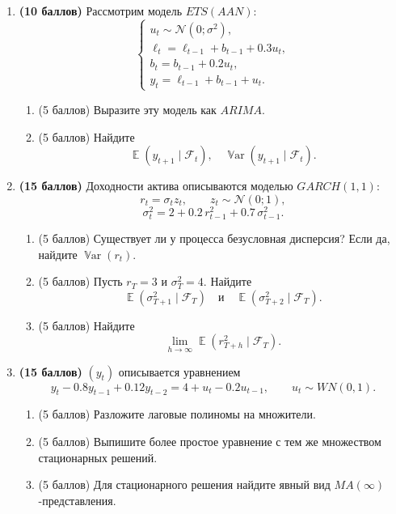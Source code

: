 \documentclass[12pt]{article}
\DeclareMathOperator{\Var}{\mathbb{V}ar}
\DeclareMathOperator{\E}{\mathbb{E}}
\newcommand \cN{\mathcal{N}}
\begin{document}
\begin{enumerate}

    \item \textbf{(10 баллов)} Рассмотрим модель $ETS(AAN)$:
    \[
    \begin{cases}
    u_t \sim \cN(0;\sigma^2),\\
    \ell_t = \ell_{t-1} + b_{t-1} + 0.3u_t,\\
    b_t = b_{t-1} + 0.2u_t,\\
    y_t = \ell_{t-1} + b_{t-1} + u_t.
    \end{cases}
    \]

    \begin{enumerate}
        \item (5 баллов) Выразите эту модель как $ARIMA$.
        \item (5 баллов) Найдите
        \[
        \E(y_{t+1}\mid \mathcal{F}_t), \quad \Var(y_{t+1}\mid \mathcal{F}_t).
        \]
    \end{enumerate}

    \item \textbf{(15 баллов)} Доходности актива описываются моделью $GARCH(1,1)$:
    \[
    r_t = \sigma_t z_t, \qquad z_t \sim \cN(0;1),
    \]
    \[
    \sigma_t^2 = 2 + 0.2\,r_{t-1}^2 + 0.7\,\sigma_{t-1}^2.
    \]

    \begin{enumerate}
        \item (5 баллов) Существует ли у процесса безусловная дисперсия? Если да, найдите $\Var(r_t)$.
        \item (5 баллов) Пусть $r_T=3$ и $\sigma_T^2=4$. Найдите
        \[
        \E(\sigma_{T+1}^2\mid \mathcal{F}_T)
        \quad \text{и} \quad
        \E(\sigma_{T+2}^2\mid \mathcal{F}_T).
        \]
        \item (5 баллов) Найдите
        \[
        \lim_{h\to\infty}\E(r_{T+h}^2\mid \mathcal{F}_T).
        \]
    \end{enumerate}

    \item \textbf{(15 баллов)} $(y_t)$ описывается уравнением
    \[
    y_t - 0.8 y_{t-1} + 0.12 y_{t-2} = 4 + u_t - 0.2 u_{t-1},
    \qquad u_t \sim WN(0,1).
    \]

    \begin{enumerate}
        \item (5 баллов) Разложите лаговые полиномы на множители.
        \item (5 баллов) Выпишите более простое уравнение с тем же множеством стационарных решений.
        \item (5 баллов) Для стационарного решения найдите явный вид $MA(\infty)$-представления.
    \end{enumerate}


\end{enumerate}
\end{document}
